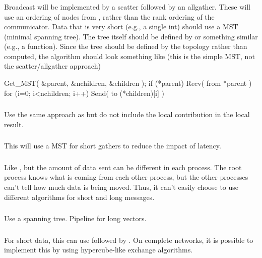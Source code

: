 \documentclass{article}
\begin{document}
\subsubsection{}
Broadcast will be implemented by a scatter followed by an allgather.  These
will use an ordering of nodes from , rather than
the rank ordering of the communicator.
Data that is very short (e.g., a single int) should use a MST (minimal
spanning tree).  The tree itself should be defined by
 or something similar (e.g., a
 function).  
Since the tree should be defined by the topology rather than computed, the
algorithm should look something like (this is the simple MST, not the
scatter/allgather approach)
\begin{algorithm}
Get_MST( \&parent, \&nchildren, \&children );
if (*parent) 
    Recv( from *parent )
for (i=0; i<nchildren; i++)
    Send( to (*children)[i] )
\end{algorithm}

\subsubsection{}
Use the same approach as  but do not include the local
contribution in the local result.

\subsubsection{}
This will use a MST for short gathers to reduce the impact of latency.  

\subsubsection{}
Like , but the amount of data sent can be different in
each process.  The root process knows what is coming from each other process,
but the other processes can't tell how much data is being moved.  Thus, it
can't easily choose to use different algorithms for short and long messages.  

\subsubsection{}
Use a spanning tree.  Pipeline for long vectors.

\subsubsection{}
For short data, this can use  followed by
.  On 
complete networks, it is possible to implement this by using hypercube-like
exchange algorithms.
\end{document}
